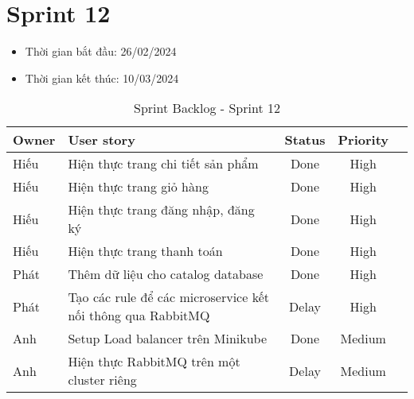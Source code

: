 \section{Sprint 12}
\begin{itemize}
    \item Thời gian bắt đầu: 26/02/2024
    \item Thời gian kết thúc: 10/03/2024
\end{itemize}
\begin{table}[H]
    \begin{tabular}{|m{2.5cm}|m{9cm}|c|c|c|}
    \hline
    \textbf{Owner}  & \textbf{User story}                                & \textbf{Status}  & \textbf{Priority} \\ \hline
    Hiếu               & Hiện thực trang chi tiết sản phẩm                    & Done                              & High         \\ \hline
    Hiếu              & Hiện thực trang giỏ hàng                     & Done                              & High         \\ \hline
    Hiếu               & Hiện thực trang đăng nhập, đăng ký                   & Done                              & High         \\ \hline
    Hiếu              & Hiện thực trang thanh toán                    & Done                              & High         \\ \hline
    Phát              & Thêm dữ liệu cho catalog database                     & Done                              & High         \\ \hline
    Phát              & Tạo các rule để các microservice kết nối thông qua RabbitMQ                     & Delay                              & High         \\ \hline
    Anh              & Setup Load balancer trên Minikube                    & Done                              & Medium         \\ \hline
    Anh              & Hiện thực RabbitMQ trên một cluster riêng                     & Delay                              & Medium         \\ \hline
    \end{tabular}
    \caption{Sprint Backlog - Sprint 12}
    \label{tab:sprint-12}
\end{table}
